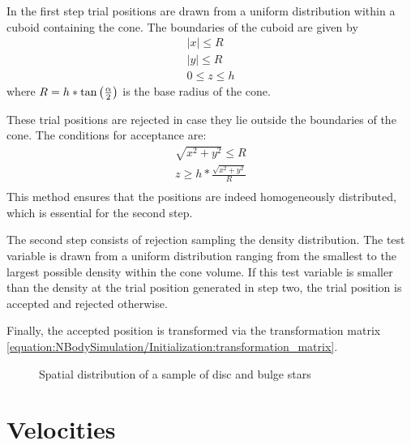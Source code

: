 \documentclass[letterpaper,10pt,english]{sphinxmanual}
\begin{document}
\sphinxAtStartPar
In the first step trial positions are drawn from a uniform distribution within a cuboid containing the cone.
The boundaries of the cuboid are given by
\begin{equation*}
\begin{split}|x|\leq R \\
|y|\leq R \\
0\leq z\leq h\end{split}
\end{equation*}
\sphinxAtStartPar
where \(R=h*\textup{tan}\left ( \frac{\alpha}{2} \right )\) is the base radius of the cone.

\sphinxAtStartPar
These trial positions are rejected in case they lie outside the boundaries of the cone.
The conditions for acceptance are:
\begin{equation*}
\begin{split}\sqrt{x^{2}+y^{2}}\leq R \\
z\geq h*\frac{\sqrt{x^{2}+y^{2}}}{R} \\\end{split}
\end{equation*}
\sphinxAtStartPar
This method ensures that the positions are indeed homogeneously distributed, which is essential for the second step.

\sphinxAtStartPar
The second step consists of rejection sampling the density distribution.
The test variable is drawn from a uniform distribution ranging from the smallest to the largest possible density within the cone volume.
If this test variable is smaller than the density at the trial position generated in step two, the trial position is accepted and rejected otherwise.

\sphinxAtStartPar
Finally, the accepted position is transformed via the transformation matrix \eqref{equation:NBodySimulation/Initialization:transformation_matrix}.

\begin{figure}[htbp]
\centering
\capstart

\noindent{}
\caption{Spatial distribution of a sample of disc and bulge stars}\label{\detokenize{NBodySimulation/Initialization:id45}}\label{\detokenize{NBodySimulation/Initialization:fig-initial-conditions-positions}}\end{figure}


\section{Velocities}
\label{\detokenize{NBodySimulation/Initialization:velocities}}
\end{document}
